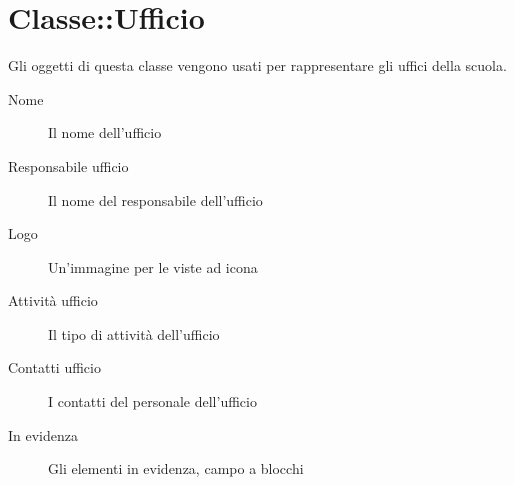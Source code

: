 \section{Classe::Ufficio}
Gli oggetti di questa classe vengono usati per rappresentare gli uffici della scuola. 
\begin{description}
\item[Nome] Il nome dell'ufficio
\item[Responsabile ufficio]Il nome del responsabile dell'ufficio
\item[Logo]Un'immagine per le viste ad icona
\item[Attività ufficio]Il tipo di attività dell'ufficio
\item[Contatti ufficio] I contatti del personale dell'ufficio
\item[In evidenza]Gli elementi in evidenza, campo a blocchi	
\end{description}



